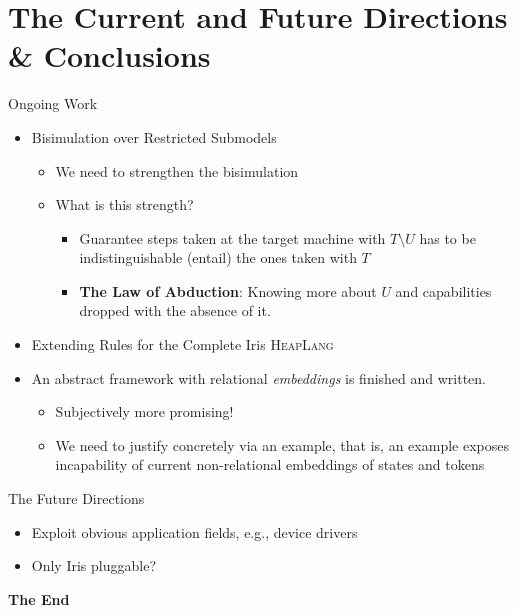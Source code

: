 \documentclass[aspectratio=169,xcolor=dvipsnames]{beamer}
\begin{document}
\section{The Current and Future Directions \& Conclusions}
\begin{frame}{Ongoing Work}
    \begin{itemize}
        \item Bisimulation over Restricted Submodels
        \begin{itemize}
            \item We need to  strengthen the bisimulation 
            \item What is this strength? 
            \begin{itemize}
                \item Guarantee steps taken at the target machine with $T\setminus U$ has to be indistinguishable (entail) the ones taken with $T$
                \item \textbf{The Law of Abduction}: Knowing more about $U$ and capabilities dropped with the absence of it.

            \end{itemize}
            
        \end{itemize}
        \item Extending Rules for the Complete Iris \textsc{HeapLang}
                        \item  An abstract framework with relational \emph{embeddings} is finished and written. 
                        \begin{itemize}
                            \item Subjectively more promising!
                            \item We need to justify concretely via an example, that is, an example exposes incapability of current non-relational embeddings of states and tokens \end{itemize}
                        \end{itemize}
\end{frame}
\begin{frame}{The Future Directions}
    \begin{itemize}
        \item Exploit obvious application fields, e.g., device drivers
        \item Only Iris pluggable?
    \end{itemize}
\end{frame}
    \scriptsize
    
    
\begin{frame}
    \Huge{\centerline{\textbf{The End}}}
\end{frame}

\end{document}
